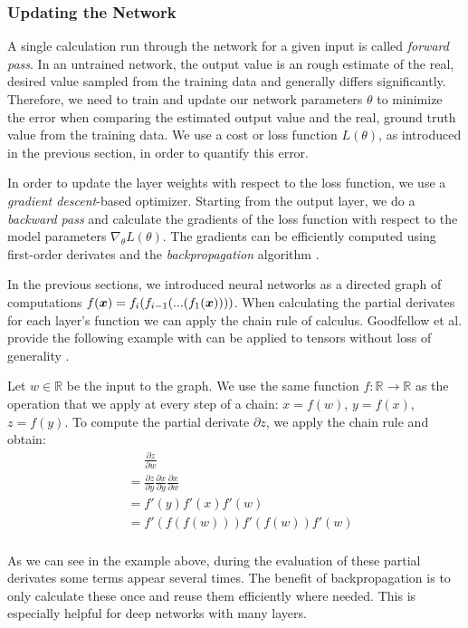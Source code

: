 \subsubsection{Updating the Network}
A single calculation run through the network for a given input is called \emph{forward pass}. In an untrained network, the output value is an rough estimate of the real, desired value sampled from the training data  and generally differs significantly. Therefore, we need to train and update our network parameters $\theta$ to minimize the error when comparing the estimated output value and the real, ground truth value from the training data. We use a cost or loss function $L(\theta)$, as introduced in the previous section, in order to quantify this error.

In order to update the layer weights with respect to the loss function, we use a \emph{gradient descent}-based optimizer. Starting from the output layer, we do a \emph{backward pass} and calculate the gradients of the loss function with respect to the model parameters $\nabla_\theta L(\theta)$. The gradients can be efficiently computed using first-order derivates and the \emph{backpropagation} algorithm  \cite{rumelhart1985learning}.

In the previous sections, we introduced neural networks as a directed graph of computations $ f(\boldsymbol{x}) = f_i(f_{i-1}(...(f_1(\boldsymbol{x})))) $. When calculating the partial derivates for each layer's function we can apply the chain rule of calculus. Goodfellow et al. provide the following example with can be applied to tensors without loss of generality \cite{Goodfellow-et-al-2016}. 

Let $w \in\mathbb{R}$ be the input to the graph. We use the same function $f: \mathbb{R} \rightarrow \mathbb{R}$ as the operation that we apply at every step of a chain: $x = f(w)$, $y = f(x)$, $z = f(y)$. To compute the partial derivate $\partial z$, we apply the chain rule and obtain:
$$
\begin{aligned}
&\phantom{{}={}} \frac{\partial z}{\partial w} \\
&= \frac{\partial z}{\partial y} \frac{\partial x}{\partial y}  \frac{\partial x}{\partial w} \\
&= f'(y) f'(x) f'(w) \\
&= f'(f(f(w)))f'(f(w))f'(w) \\
\end{aligned}
$$

As we can see in the example above, during the evaluation of these partial derivates some terms appear several times. The benefit of  backpropagation is to only calculate these once and reuse them efficiently where needed. This is especially helpful for deep networks with many layers.

